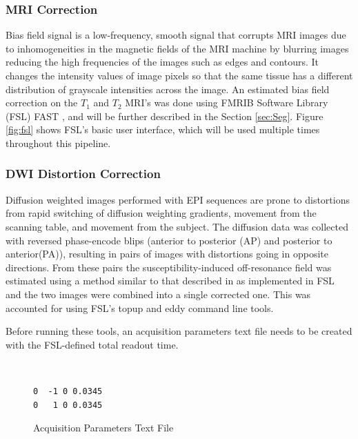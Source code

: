 \subsubsection{MRI Correction}

Bias field signal is a low-frequency, smooth signal that corrupts MRI images due to inhomogeneities in the magnetic fields of the MRI machine by blurring images reducing the high frequencies of the images such as edges and contours. It changes the intensity values of image pixels so that the same tissue has a different distribution of grayscale intensities across the image. \cite{ref:bias} An estimated bias field correction on the $T_1$ and $T_2$ MRI's was done using FMRIB Software Library (FSL) FAST \cite{ref:fslfast}, and will be further described in the Section \ref{sec:Seg}. Figure \ref{fig:fsl} shows FSL's basic user interface, which will be used multiple times throughout this pipeline. 

\subsubsection{DWI Distortion Correction}

Diffusion weighted images performed with EPI sequences are prone to distortions from rapid switching of diffusion weighting gradients, movement from the scanning table, and movement from the subject. The diffusion data was collected with reversed phase-encode blips (anterior to posterior (AP) and posterior to anterior(PA)), resulting in pairs of images with distortions going in opposite directions. From these pairs the susceptibility-induced off-resonance field was estimated using a method similar to that described in \cite{ref:fsltopup1} as implemented in FSL \cite{ref:fsltopup2} and the two images were combined into a single corrected one. This was accounted for using FSL's topup and eddy command line tools.

Before running these tools, an acquisition parameters text file needs to be created with the FSL-defined total readout time. 

\begin{figure}[H]
\centering
{\tt
\begin{varwidth}{\linewidth}
\begin{verbatim}
0  -1 0 0.0345
0   1 0 0.0345
\end{verbatim}
\end{varwidth}
}
\label{fig:acq}
\caption{Acquisition Parameters Text File}
\end{figure}

